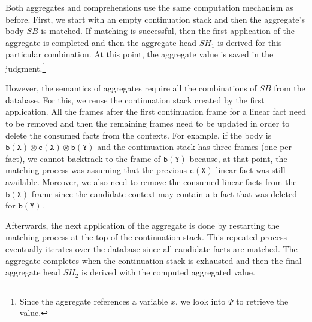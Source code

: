 Both aggregates and comprehensions use the same computation mechanism as before.
First, we start with an empty continuation stack and then the aggregate's body
$SB$ is matched. If matching is successful, then the first application of the
aggregate is completed and then the aggregate head $SH_1$ is derived for this
particular combination. At this point, the aggregate value is saved in the
judgment.\footnote{Since the aggregate references a variable $x$, we look into
   $\Psi$ to retrieve the value.}

However, the semantics of aggregates require all the combinations of $SB$ from
the database. For this, we reuse the continuation stack created by the first
application. All the frames after the first continuation frame for a linear fact
need to be removed and then the remaining frames need to be updated in order to
delete the consumed facts from the contexts. For example, if the body is
$\mathtt{b(X)} \otimes \mathtt{c(X)} \otimes \mathtt{b(Y)}$ and the continuation
stack has three frames (one per fact), we cannot backtrack to the frame of
$\mathtt{b(Y)}$ because, at that point, the matching process was assuming that
the previous $\mathtt{c(X)}$ linear fact was still available.  Moreover, we also
need to remove the consumed linear facts from the $\mathtt{b(X)}$ frame
since the candidate context may contain a $\mathtt{b}$ fact that was deleted
for $\mathtt{b(Y)}$.

Afterwards, the next application of the aggregate is done by restarting the
matching process at the top of the continuation stack. This repeated process
eventually iterates over the database since all candidate facts are matched.
The aggregate completes when the continuation stack is exhausted and then the
final aggregate head $SH_2$ is derived with the computed aggregated value.


